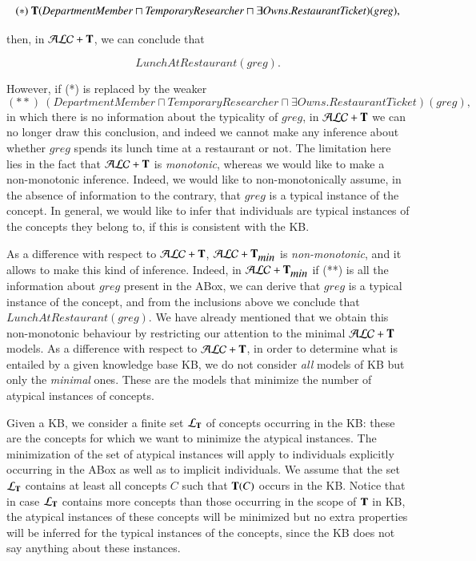 \documentclass[a4paper, 11pt, oneside]{elsarticle}
\newcommand{\tip}{{\bf T}}
\newcommand{\alct}{\mathcal{ALC}+\tip}
\newcommand{\alctmin}{\mathcal{ALC}+\tip_{\mbox{\em min}}}
\newcommand {\ellet} {\mathcal{L}_{\bf T}}
\begin{document}
$$(*)  \ \tip(\mathit{DepartmentMember} \sqcap \mathit{TemporaryResearcher} \sqcap \exists \mathit{Owns}.\mathit{RestaurantTicket})(\mathit{greg}),$$


\noindent then, in $\alct$, we can conclude
that

$$\mathit{LunchAtRestaurant(\mathit{greg})}.$$

\noindent However, if (*) is replaced by the weaker
$$(**)  \ (\mathit{DepartmentMember} \sqcap \mathit{TemporaryResearcher} \sqcap \exists \mathit{Owns}.\mathit{RestaurantTicket})(\mathit{greg}),$$ in which
there is no information about the typicality of $\mathit{greg}$,
in $\alct$ we can no longer draw this conclusion, and indeed we
cannot make any inference about whether $\mathit{greg}$ spends its
lunch time at a restaurant or not. The limitation here lies in the
fact that $\alct$ is {\em monotonic}, whereas we would like to
make a non-monotonic inference. Indeed, we would like to
non-monotonically assume, in the absence of information to the
contrary, that $\mathit{greg}$ is a typical instance of the
concept. In general, we would like to infer that individuals are
typical instances of the concepts they belong to, if this is
consistent with the KB.

As a difference with respect to $\alct$, $\alctmin$ is {\em non-monotonic}, and it allows to make this kind of inference. Indeed, in $\alctmin$ if (**) is all the information about $\mathit{greg}$ present in the ABox, we can derive that $\mathit{greg}$ is a typical instance of the concept, and from the inclusions above we conclude that $\mathit{LunchAtRestaurant(\mathit{greg})}.$
 We have already mentioned that we obtain this non-monotonic behaviour by restricting our attention to the  minimal $\alct$ models. As a difference with respect to $\alct$,
 in order to determine what is entailed by  a given knowledge base KB, we do not consider {\em all} models of KB but only the {\em minimal} ones. These are the models that minimize the number of atypical instances of  concepts.

Given a KB, we consider a finite set $\ellet$ of concepts
occurring in the KB: these are the concepts for which we want to
minimize the atypical instances.
The minimization of the set of atypical instances will apply to
individuals explicitly occurring in the ABox as well as to
implicit individuals. We assume that the set $\ellet$ contains at
least all concepts $C$ such that $\tip(C)$ occurs in the KB.
Notice that in case $\ellet$ contains more concepts than
those occurring in the scope of $\tip$ in KB, the atypical
instances of these concepts will be minimized but no extra
properties will be inferred for the typical instances of the
concepts, since the KB does not say anything about these
instances.
\end{document}
